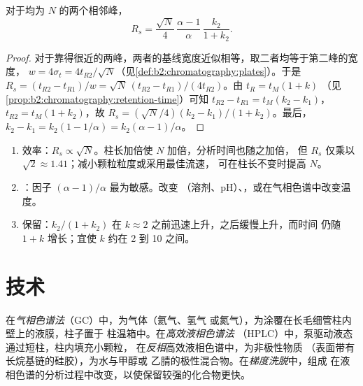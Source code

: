\begin{theorem}[分离度方程]\label{thm:b2:chromatography:resolution}
对于均为 $N$ 的两个相邻峰，
\begin{equation*}
R_s = \frac{\sqrt N}{4}\,\frac{\alpha - 1}{\alpha}\,\frac{k_2}{1 + k_2}.
\end{equation*}
\end{theorem}

\begin{proof}
对于靠得很近的两峰，两者的基线宽度近似相等，取二者均等于第二峰的宽度，
$w = 4\sigma_t = 4t_{R2}/\sqrt N$（见\cref{def:b2:chromatography:plates}）。于是 $R_s = (t_{R2} -
t_{R1})/w = \sqrt N\,(t_{R2} - t_{R1})/(4t_{R2})$。由 $t_R = t_M(1 + k)$
（见\cref{prop:b2:chromatography:retention-time}）可知 $t_{R2} - t_{R1} = t_M(k_2 - k_1)$，$t_{R2} =
t_M(1 + k_2)$，故 $R_s = (\sqrt N/4)(k_2 - k_1)/(1 + k_2)$。最后，$k_2 - k_1 = k_2(1 - 1/\alpha) =
k_2(\alpha - 1)/\alpha$。
\end{proof}

\begin{method}[提高分离度]\label{met:b2:chromatography:improve-resolution}
\begin{enumerate}
  \item 效率：$R_s \propto \sqrt N$。柱长加倍使 $N$ 加倍，分析时间也随之加倍，
        但 $R_s$ 仅乘以 $\sqrt2 \approx 1.41$；减小颗粒粒度或采用最佳流速，
        可在柱长不变时提高 $N$。
  \item {}：因子 $(\alpha - 1)/\alpha$ 最为敏感。改变
        （溶剂、pH）、，或在气相色谱中改变温度。
  \item 保留：$k_2/(1+k_2)$ 在 $k \approx 2$ 之前迅速上升，之后缓慢上升，而时间
        仍随 $1 + k$ 增长；宜使 $k$ 约在 2 到 10 之间。
\end{enumerate}
\end{method}

\section{技术}

\begin{definition}[色谱技术]\label{def:b2:chromatography:techniques}
在\emph{气相色谱法}（GC）中，为气体（氦气、氢气
或氮气），为涂覆在长毛细管柱内壁上的液膜，柱子置于
柱温箱中。在\emph{高效液相色谱法}
（HPLC）中，泵驱动液态通过短柱，柱内填充小颗粒，
在\emph{反相}高效液相色谱中，为非极性物质
（表面带有长烷基链的硅胶），为水与甲醇或
乙腈的极性混合物。在\emph{梯度洗脱}中，组成
在液相色谱的分析过程中改变，以使保留较强的化合物更快。
\end{definition}

